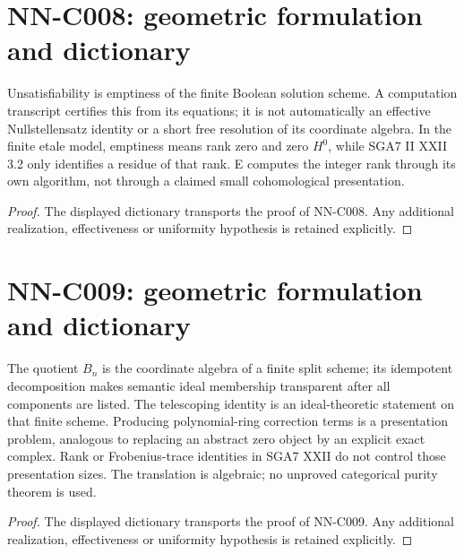 \section{NN-C008: geometric formulation and dictionary}
\begin{geometricstatement}[NN-C008]
Unsatisfiability is emptiness of the finite Boolean solution scheme. A computation transcript certifies this from its equations; it is not automatically an effective Nullstellensatz identity or a short free resolution of its coordinate algebra. In the finite etale model, emptiness means rank zero and zero $H^0$, while SGA7 II XXII 3.2 only identifies a residue of that rank. E computes the integer rank through its own algorithm, not through a claimed small cohomological presentation.
\end{geometricstatement}
\begin{proof} The displayed dictionary transports the proof of NN-C008. Any additional realization, effectiveness or uniformity hypothesis is retained explicitly.\end{proof}


\section{NN-C009: geometric formulation and dictionary}
\begin{geometricstatement}[NN-C009]
The quotient $B_n$ is the coordinate algebra of a finite split scheme; its idempotent decomposition makes semantic ideal membership transparent after all components are listed. The telescoping identity is an ideal-theoretic statement on that finite scheme. Producing polynomial-ring correction terms is a presentation problem, analogous to replacing an abstract zero object by an explicit exact complex. Rank or Frobenius-trace identities in SGA7 XXII do not control those presentation sizes. The translation is algebraic; no unproved categorical purity theorem is used.
\end{geometricstatement}
\begin{proof} The displayed dictionary transports the proof of NN-C009. Any additional realization, effectiveness or uniformity hypothesis is retained explicitly.\end{proof}


